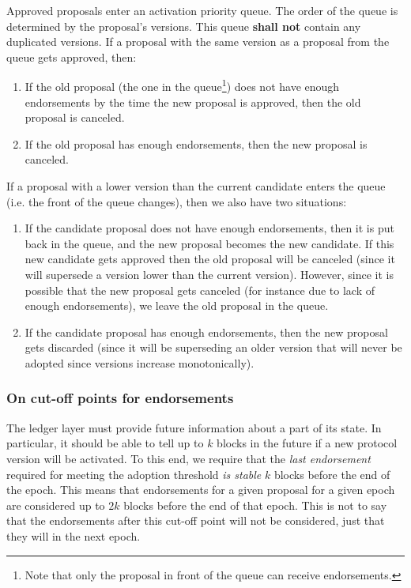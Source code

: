 Approved proposals enter an activation priority queue. The order of the queue is
determined by the proposal's versions. This queue \textbf{shall not} contain any
duplicated versions. If a proposal with the same version as a proposal from the
queue gets approved, then:

\begin{enumerate}
	\item If the old proposal (the one in the queue\footnote{Note that only the
		proposal in front of the queue can receive endorsements.}) does not have
	enough endorsements by the time the new proposal is approved, then the old
	proposal is canceled.
	\item If the old proposal has enough endorsements, then the new proposal is
	canceled.
\end{enumerate}


If a proposal with a lower version than the current candidate enters the queue
(i.e. the front of the queue changes), then we also have two situations:

\begin{enumerate}
	\item If the candidate proposal does not have enough endorsements, then it
	is
	put back in the queue, and the new proposal becomes the new candidate. If
	this
	new candidate gets approved then the old proposal will be canceled (since it
	will supersede a version lower than the current version). However, since it
	is
	possible that the new proposal gets canceled (for instance due to lack of
	enough endorsements), we leave the old proposal in the queue.
	\item If the candidate proposal has enough endorsements, then the new
	proposal
	gets discarded (since it will be superseding an older version that will
	never
	be adopted since versions increase monotonically).
\end{enumerate}

\subsubsection{On cut-off points for endorsements}
\label{sec:on-cutoff-points-for-endorsements}

The ledger layer must provide future information about a part of its state. In
particular, it should be able to tell up to $k$ blocks in the future if a
new protocol version will be activated. To this end, we require that the
\emph{last endorsement} required for meeting the adoption threshold \emph{is
	stable} $k$ blocks before the end of the epoch. This means that
endorsements for a given proposal for a given epoch are considered up to
$2k$ blocks before the end of that epoch. This is not to say that the
endorsements after this cut-off point will not be considered, just that they
will in the next epoch.

